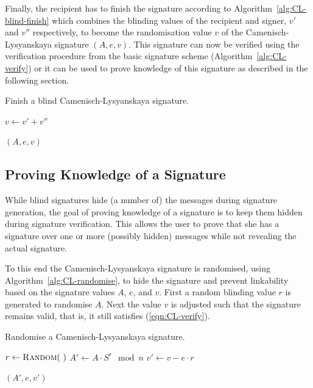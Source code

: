 Finally, the recipient has to finish the signature according to
Algorithm~\ref{alg:CL-blind-finish} which combines the blinding values of the
recipient and signer, $v'$ and $v''$ respectively, to become the randomisation
value $v$ of the Camenisch-Lysyanskaya signature $(A, e, v)$. This signature can
now be verified using the verification procedure from the basic signature scheme
(Algorithm~\ref{alg:CL-verify}) or it can be used to prove knowledge of this
signature as described in the following section.

\begin{algorithm}
  \caption{Finish a blind Camenisch-Lysyanskaya signature.}
  \label{alg:CL-blind-finish}
  \addtolength{\baselineskip}{1mm}
  \begin{algorithmic}[1]
      \State $v \gets v' + v''$

      \Return $(A, e, v)$
    \EndFunction
  \end{algorithmic}
\end{algorithm}

\subsection{Proving Knowledge of a Signature}\label{sec:cl_proof}

While blind signatures hide (a number of) the messages during signature
generation, the goal of proving knowledge of a signature is to keep them hidden
during signature verification. This allows the user to prove that she has a
signature over one or more (possibly hidden) messages while not revealing the
actual signature.

To this end the Camenisch-Lysyanskaya signature is randomised, using
Algorithm~\ref{alg:CL-randomise}, to hide the signature and prevent linkability
based on the signature values $A$, $e$, and $v$. First a random blinding value
$r$ is generated to randomise $A$. Next the value $v$ is adjusted such that the
signature remains valid, that is, it still satisfies (\ref{eqn:CL-verify}).

\begin{algorithm}
  \caption{Randomise a Camenisch-Lysyanskaya signature.}
  \label{alg:CL-randomise}
  \addtolength{\baselineskip}{1mm}
  \begin{algorithmic}[1]
      \State $r \gets \Call{Random}{~}$
      \State $A' \gets A \cdot S^{r} \mod n$
      \State $v' \gets v - e \cdot r$

      \Return $(A', e, v')$
    \EndFunction
  \end{algorithmic}
\end{algorithm}

